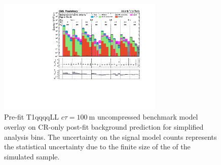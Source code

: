 \begin{figure}[h!]
    \begin{center}
        \includegraphics[width=0.7\textwidth]{figures/susyLLResults/app/T1qqqqLL_ctau_100000_mGluino-1000_mLSP-900/all_full-fit-sig}
        \caption{
            Pre-fit T1qqqqLL $c\tau=100~\mathrm{m}$ uncompressed benchmark
            model overlay on CR-only post-fit background prediction for
            simplified analysis bins. The uncertainty on the signal model counts
            represents the statistical uncertainty due to the finite size of the
            of the simulated sample.
        }
        \label{fig:T1qqqqLL_ctau_100000_uncompressed_MR_simp}
    \end{center}
\end{figure}
